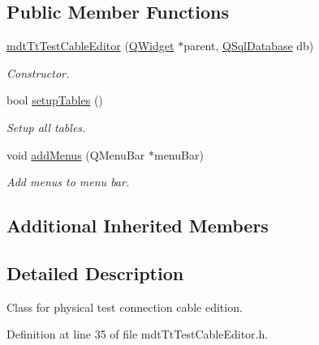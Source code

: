 \subsection*{Public Member Functions}
\begin{DoxyCompactItemize}
\item 
\hyperlink{classmdt_tt_test_cable_editor_a6924bbf2529e2b85d08a8134411ecd59}{mdt\-Tt\-Test\-Cable\-Editor} (\hyperlink{class_q_widget}{Q\-Widget} $\ast$parent, \hyperlink{class_q_sql_database}{Q\-Sql\-Database} db)
\begin{DoxyCompactList}\small\item\em Constructor. \end{DoxyCompactList}\item 
bool \hyperlink{classmdt_tt_test_cable_editor_a8feb6a7ed2e1ad3de6e1c61cca8e5185}{setup\-Tables} ()
\begin{DoxyCompactList}\small\item\em Setup all tables. \end{DoxyCompactList}\item 
void \hyperlink{classmdt_tt_test_cable_editor_afc87688d1fd0e3a48ca5239b95154827}{add\-Menus} (Q\-Menu\-Bar $\ast$menu\-Bar)
\begin{DoxyCompactList}\small\item\em Add menus to menu bar. \end{DoxyCompactList}\end{DoxyCompactItemize}
\subsection*{Additional Inherited Members}


\subsection{Detailed Description}
Class for physical test connection cable edition. 

Definition at line 35 of file mdt\-Tt\-Test\-Cable\-Editor.\-h.



